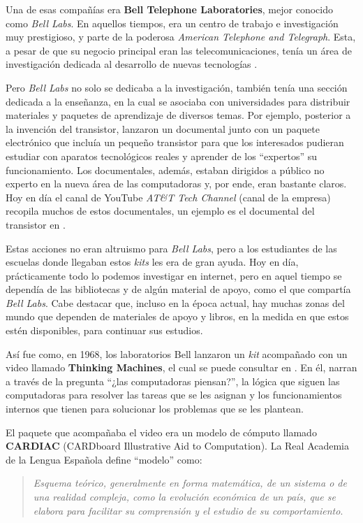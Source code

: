 \documentclass[letterpaper,12pt,oneside]{book}
\begin{document}
        Una de esas compañías era \textbf{Bell Telephone 
		Laboratories}, mejor conocido como \textit{Bell Labs}. En aquellos tiempos, era un centro de trabajo e investigación muy prestigioso, y parte de la
		poderosa \textit{American Telephone and Telegraph}. Esta, a pesar de que su negocio
		principal eran las telecomunicaciones, tenía un área de investigación dedicada al desarrollo de nuevas tecnologías \cite{isaacson_innovators_2014}.
  
        Pero \textit{Bell Labs} no solo se dedicaba a la investigación,
		también tenía una sección dedicada a la enseñanza, en la cual se asociaba con universidades para distribuir materiales y paquetes de aprendizaje de diversos
		temas. Por ejemplo, posterior a la invención del transistor, lanzaron un documental junto
		con un paquete electrónico que incluía un pequeño transistor para que los interesados pudieran estudiar con aparatos tecnológicos reales y aprender
		de los ``expertos'' su funcionamiento. Los documentales, además, estaban dirigidos a público no experto en la nueva área de las computadoras y, por ende,
		eran bastante claros. Hoy en día el canal de YouTube \textit{AT\&T Tech Channel} (canal de la empresa) recopila muchos de estos documentales, un ejemplo es el 
		documental del transistor en \cite{att_tech_channel_transistor_2015}.
		
		
		
		Estas acciones no eran altruismo para \textit{Bell Labs}, pero a los estudiantes de las 
		escuelas donde
		llegaban estos \textit{kits} les era de gran ayuda. Hoy en día, prácticamente todo lo podemos investigar en internet, pero en aquel tiempo se dependía de las
		bibliotecas y de algún material de apoyo, como el que compartía \textit{Bell Labs}. Cabe destacar que, incluso en la época actual, hay muchas zonas del mundo
		que dependen de materiales de apoyo y libros, en la medida en que estos estén disponibles, para continuar sus estudios.
		
		Así fue como, en 1968, los laboratorios Bell lanzaron un \textit{kit} acompañado con un video llamado \textbf{Thinking Machines}, el
		cual se puede consultar en  \cite{att_tech_channel_att_2012}. En él,  narran
		a través de la pregunta ``¿las computadoras piensan?'', la lógica que siguen las computadoras para resolver las tareas que se les asignan y los funcionamientos
		internos que tienen para solucionar los problemas que se les plantean.

        El paquete que acompañaba el video era un modelo de cómputo llamado \textbf{CARDIAC} (CARDboard Illustrative Aid to Computation). La Real Academia de la Lengua Española define  ``modelo'' como:
        \begin{quote}
			\emph{ Esquema teórico, generalmente en forma matemática, de un sistema o de una realidad compleja, como la evolución económica de un país, que se elabora para facilitar su comprensión y el estudio de su comportamiento}.
		\end{quote}
\end{document}
